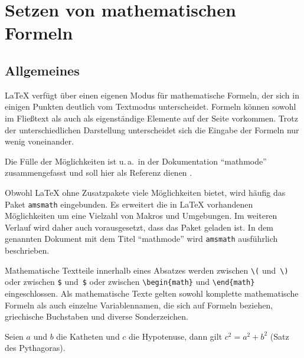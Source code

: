 

\section{Setzen von mathematischen Formeln} \label{math}


\subsection{Allgemeines}

\LaTeX{} verfügt über einen eigenen Modus für mathematische Formeln, der sich
in einigen Punkten deutlich vom Textmodus unterscheidet. Formeln können sowohl
im Fließtext als auch als eigenständige Elemente auf der Seite vorkommen.
Trotz der unterschiedlichen Darstellung  unterscheidet sich die Eingabe der
Formeln nur wenig voneinander.

Die Fülle der Möglichkeiten ist u.\,a.\ in der Dokumentation \enquote{mathmode}
zusammengefasst und soll hier als Referenz dienen \cite{mathmode}.

Obwohl \LaTeX{} ohne Zusatzpakete viele Möglichkeiten bietet, wird häufig
das Paket \texttt{amsmath} eingebunden. Es erweitert die in \LaTeX{}
vorhandenen Möglichkeiten  um eine Vielzahl von Makros und Umgebungen. Im
weiteren Verlauf wird daher auch vorausgesetzt, dass das Paket geladen ist. In
dem genannten Dokument mit dem Titel \enquote{mathmode} wird \texttt{amsmath}
ausführlich beschrieben.

Mathematische Textteile innerhalb eines Absatzes werden zwischen
\lstinline|\(| und~\lstinline|\)| oder zwischen \lstinline|$| und~\lstinline|$| oder
zwischen \lstinline|\begin{math}| und \lstinline|\end{math}|
eingeschlossen.
Als mathematische Texte gelten sowohl komplette mathematische
Formeln als auch einzelne Variablennamen, die sich auf Formeln
beziehen, griechische Buchstaben und diverse Sonderzeichen.

\begin{LTXexample}
Seien $a$ und $b$ die Katheten
und $c$ die Hypotenuse,
dann gilt $c^{2}=a^{2}+b^{2}$
(Satz des Pythagoras).
\end{LTXexample}

